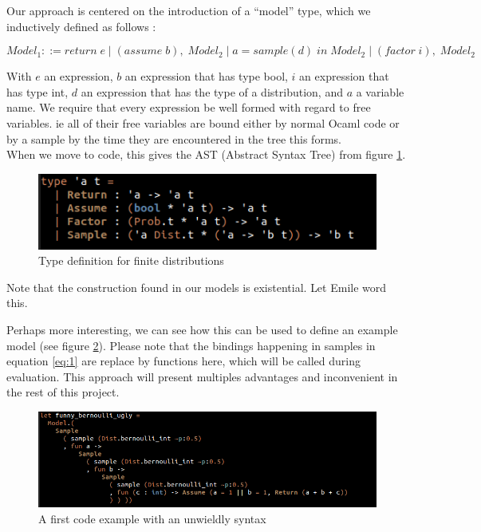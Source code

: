 \documentclass{article}
\newcommand\SC[1]{{\color{violet}{\it \bf Simon :} #1}}
\begin{document}
	Our approach is centered on the introduction of a ``model'' type, which we inductively defined as follows : 


	\begin{equation}
	  Model_1 ::= return \; e \; | \; (assume \; b), \; Model_2 \; | \; a = sample(d) \; in \;Model_2 \; | \;  (factor \; i), \; Model_2
	  \label{eq:1}
	\end{equation}

	With $e$ an expression, $b$ an expression that has type bool, $i$ an expression that has type int, $d$ an expression that has the type of a distribution, and $a$ a variable name.
	We require that every expression be well formed with regard to free variables. ie all of their free variables are bound either by normal Ocaml code or by a sample by the time they are encountered in the tree this forms. \\

	When we move to code, this gives the AST (Abstract Syntax Tree) from figure \ref{fig:AST1}.
	\begin{figure}[h]
	  \centering
	  \includegraphics[scale=0.7]{images/AST1.png}
	  \caption{Type definition for finite distributions}
	  \label{fig:AST1}
	\end{figure}
	
	Note that the construction found in our models is existential. \SC{Let Emile word this.}

	Perhaps more interesting, we can see how this can be used to define an example model (see figure \ref{fig:UglyEx}).
	Please note that the bindings happening in samples in equation \ref{eq:1} are replace by functions here, which will be called during evaluation.
	This approach will present multiples advantages and inconvenient in the rest of this project.

	\begin{figure}[h]
	  \centering
	  \includegraphics[scale=0.5]{images/ExampleUgly.png}
	  \caption{A first code example with an unwieldly syntax}
	  \label{fig:UglyEx}
	\end{figure}
\end{document}

